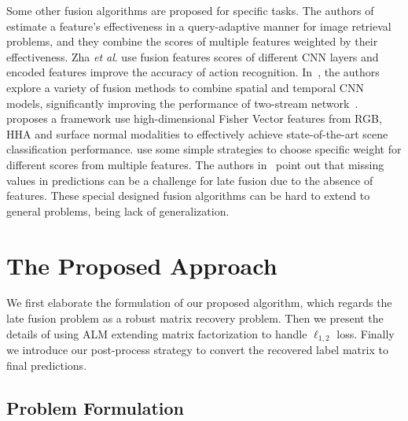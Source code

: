 \documentclass[letterpaper]{article} %
\def\etal{\emph{et al}.}
\begin{document}
Some other fusion algorithms are proposed for specific tasks.
The authors of \cite{zheng2015query} estimate a feature’s effectiveness in a query-adaptive manner for image retrieval problems,
and they combine the scores of multiple features weighted by their effectiveness.
Zha \etal \cite{zha2015exploiting} use fusion features scores of different CNN layers and encoded features improve the accuracy of action recognition.
In~\cite{feichtenhofer2016convolutional}, the authors explore a variety of fusion methods to combine spatial and temporal CNN models, significantly improving the performance of two-stream network~\cite{simonyan2014two}.
\cite{wangmodality} proposes a framework use high-dimensional Fisher Vector features from RGB, HHA and surface normal modalities to effectively achieve state-of-the-art scene classification performance.
\cite{Wang_Transformation,yaohighlight} use some simple strategies to choose specific weight for different scores from multiple features.
The authors in~\cite{vanicassp2014late} point out that missing values in predictions can be a challenge for late fusion due to the absence of features.
These special designed fusion algorithms can be hard to extend to general problems, being lack of generalization.



\section{The Proposed Approach}


We first elaborate the formulation of our proposed algorithm,
which regards the late fusion problem as a robust matrix recovery problem.
Then we present the details of using ALM extending matrix factorization to handle $\ell_{1,2}$ loss.
Finally we introduce our post-process strategy to convert the recovered label matrix to final predictions.

\subsection{Problem Formulation}
\end{document}
